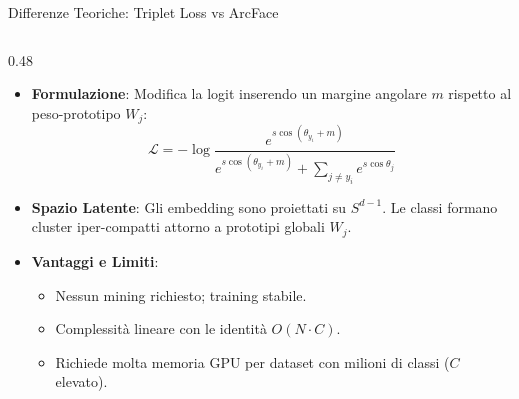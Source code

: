 \documentclass[aspectratio=169, 10pt]{beamer}
\begin{document}
\begin{frame}{Differenze Teoriche: Triplet Loss vs ArcFace}
\begin{columns}[T, onlytextwidth]
\begin{column}{0.48\textwidth}
    \smallskip
    \begin{itemize}
        \setlength{\itemsep}{2pt}
        \setlength{\parskip}{0pt}
        \scriptsize
        \item \textbf{Formulazione}: Modifica la logit inserendo un margine angolare $m$ rispetto al peso-prototipo $W_j$:
        \[
          \mathcal{L} = -\log \frac{e^{s \cos(\theta_{y_i} + m)}}{e^{s \cos(\theta_{y_i} + m)} + \sum_{j \neq y_i} e^{s \cos \theta_j}}
        \]
        \item \textbf{Spazio Latente}: Gli embedding sono proiettati su $S^{d-1}$. Le classi formano cluster iper-compatti attorno a prototipi globali $W_j$.
        \item \textbf{Vantaggi e Limiti}:
            \begin{itemize}
                \scriptsize
                \item Nessun mining richiesto; training stabile.
                \item Complessità lineare con le identità $O(N \cdot C)$.
                \item Richiede molta memoria GPU per dataset con milioni di classi ($C$ elevato).
            \end{itemize}
    \end{itemize}
\end{column}

\end{columns}
\end{frame}

\end{document}
